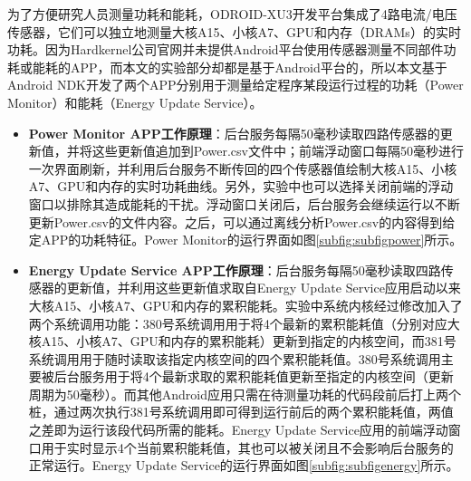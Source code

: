 为了方便研究人员测量功耗和能耗，ODROID-XU3开发平台集成了4路电流/电压传感器，它们可以独立地测量大核A15、小核A7、GPU和内存（DRAMs）的实时功耗。因为Hardkernel公司官网并未提供Android平台使用传感器测量不同部件功耗或能耗的APP，而本文的实验部分却都是基于Android平台的，所以本文基于Android NDK开发了两个APP分别用于测量给定程序某段运行过程的功耗（Power Monitor）和能耗（Energy Update Service）。
\begin{itemize}
  \item \textbf{Power Monitor APP工作原理}：后台服务每隔50毫秒读取四路传感器的更新值，并将这些更新值追加到Power.csv文件中；前端浮动窗口每隔50毫秒进行一次界面刷新，并利用后台服务不断传回的四个传感器值绘制大核A15、小核A7、GPU和内存的实时功耗曲线。另外，实验中也可以选择关闭前端的浮动窗口以排除其造成能耗的干扰。浮动窗口关闭后，后台服务会继续运行以不断更新Power.csv的文件内容。之后，可以通过离线分析Power.csv的内容得到给定APP的功耗特征。Power Monitor的运行界面如图\ref{subfig:subfigpower}所示。
  \item \textbf{Energy Update Service APP工作原理}：后台服务每隔50毫秒读取四路传感器的更新值，并利用这些更新值求取自Energy Update Service应用启动以来大核A15、小核A7、GPU和内存的累积能耗。实验中系统内核经过修改加入了两个系统调用功能：380号系统调用用于将4个最新的累积能耗值（分别对应大核A15、小核A7、GPU和内存的累积能耗）更新到指定的内核空间，而381号系统调用用于随时读取该指定内核空间的四个累积能耗值。380号系统调用主要被后台服务用于将4个最新求取的累积能耗值更新至指定的内核空间（更新周期为50毫秒）。而其他Android应用只需在待测量功耗的代码段前后打上两个桩，通过两次执行381号系统调用即可得到运行前后的两个累积能耗值，两值之差即为运行该段代码所需的能耗。Energy Update Service应用的前端浮动窗口用于实时显示4个当前累积能耗值，其也可以被关闭且不会影响后台服务的正常运行。Energy Update Service的运行界面如图\ref{subfig:subfigenergy}所示。
\end{itemize}

